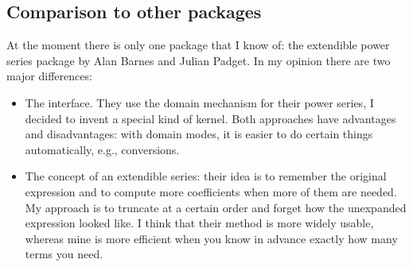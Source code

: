\subsection{Comparison to other packages}

At the moment there is only one \REDUCE{} package that I know of:
the extendible power series package by Alan Barnes and Julian Padget.
In my opinion there are two major differences:
\begin{itemize}
  \item The interface. They use the domain mechanism for their power
        series, I decided to invent a special kind of kernel. Both
        approaches have advantages and disadvantages: with domain
        modes, it is easier
        to do certain things automatically, e.g., conversions.
  \item The concept of an extendible series: their idea is to remember
        the original expression and to compute more coefficients when
        more of them are needed. My approach is to truncate at a
        certain order and forget how the unexpanded expression
        looked like.  I think that their method is more widely
        usable, whereas mine is more efficient when you know in
        advance exactly how many terms you need.
\end{itemize}


